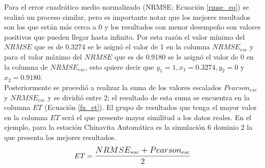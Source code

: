 Para el error cuadrático medio normalizado (NRMSE; Ecuación \ref{rmse_eq}) se realizó un proceso similar, pero es importante notar que los mejores resultados son los que están más cerca a 0 y los resultados con menor desempeño son valores positivos que pueden llegar hasta infinito. Por esta razón el valor mínimo del $NRMSE$ que es de 0.3274 se le asignó el valor de 1 en la columna $NRMSE_{esc}$ y para el valor máximo del $NRMSE$ que es de 0.9180 se le asignó el valor de 0 en la columna de $NRMSE_{esc}$, esto quiere decir que $y_1 =1, x_1 = 0.3274, y_2 = 0$ y $x_2 = 0.9180$.\\



Posteriormente se procedió a realizar la suma de los valores escalados $Pearson_{esc}$ y $NRMSE_{esc}$ y se dividió entre 2; el resultado de esta suma se encuentra en la columna $ET$ (Ecuación \ref{fx_et}). El grupo de resultados que tenga el mayor valor en la columna $ET$ será el que presente mayor similitud a los datos reales. En el ejemplo, para la estación Chinavita Automática es la simulación 6 dominio 2 la que presenta los mejores resultados.\\

\begin{equation} \label{fx_et}
    ET = \mathlarger{\frac{{NRMSE}_{esc} + Pearson_{esc}}{2}}
\end{equation}


